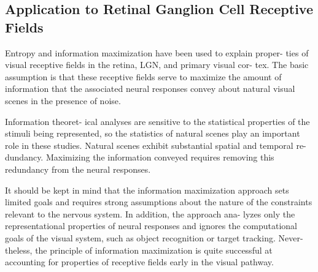 \subsection{Application to Retinal Ganglion Cell Receptive Fields}
\begin{asm}
  Entropy and information maximization have been used to explain proper-
ties of visual receptive fields in the retina, LGN, and primary visual cor-
tex. The basic assumption is that these receptive fields serve to maximize
the amount of information that the associated neural responses convey
about natural visual scenes in the presence of noise.
\end{asm}
\begin{rem}
  Information theoret-
ical analyses are sensitive to the statistical properties of the stimuli being
represented, so the statistics of natural scenes play an important role in
these studies. Natural scenes exhibit substantial spatial and temporal re-
dundancy. Maximizing the information conveyed requires removing this
redundancy from the neural responses.
\end{rem}
\begin{rem}
  It should be kept in mind that the information maximization approach
sets limited goals and requires strong assumptions about the nature of the
constraints relevant to the nervous system. In addition, the approach ana-
lyzes only the representational properties of neural responses and ignores
the computational goals of the visual system, such as object recognition
or target tracking. Never-
theless, the principle of information maximization is quite successful at
accounting for properties of receptive fields early in the visual pathway.
\end{rem}

